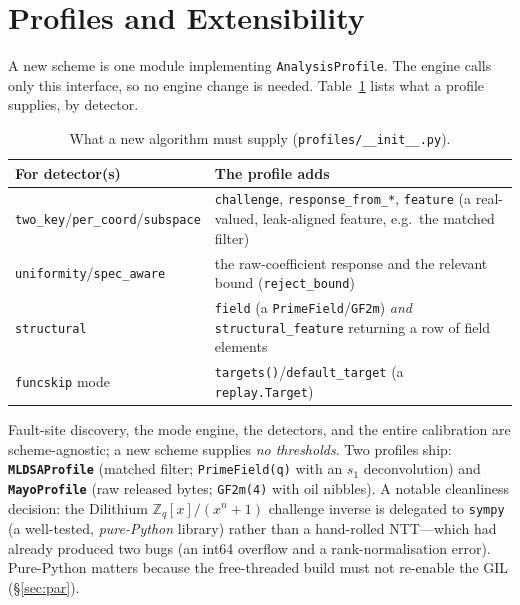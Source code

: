 \documentclass[11pt]{article}
\newcommand{\code}[1]{\texttt{#1}}
\newcommand{\Zq}{\ensuremath{\mathbb{Z}_q}}
\begin{document}
\section{Profiles and Extensibility}\label{sec:profiles}

A new scheme is one module implementing \code{AnalysisProfile}. The engine calls
only this interface, so no engine change is needed. Table~\ref{tab:profile} lists
what a profile supplies, by detector.

\begin{table}[h]
\centering\small
\caption{What a new algorithm must supply (\code{profiles/\_\_init\_\_.py}).}
\label{tab:profile}
\begin{tabular}{@{}p{3.0cm}p{9.5cm}@{}}
\toprule
For detector(s) & The profile adds \\
\midrule
\code{two\_key}/\code{per\_coord}/\code{subspace} & \code{challenge}, \code{response\_from\_*}, \code{feature} (a real-valued, leak-aligned feature, e.g.\ the matched filter) \\
\code{uniformity}/\code{spec\_aware} & the raw-coefficient response and the relevant bound (\code{reject\_bound}) \\
\code{structural} & \code{field} (a \code{PrimeField}/\code{GF2m}) \emph{and} \code{structural\_feature} returning a row of field elements \\
\code{funcskip} mode & \code{targets()}/\code{default\_target} (a \code{replay.Target}) \\
\bottomrule
\end{tabular}
\end{table}

Fault-site discovery, the mode engine, the detectors, and the entire calibration are
scheme-agnostic; a new scheme supplies \emph{no thresholds}. Two profiles ship:
\textbf{\code{MLDSAProfile}} (matched filter; \code{PrimeField(q)} with an $s_1$
deconvolution) and \textbf{\code{MayoProfile}} (raw released bytes;
\code{GF2m(4)} with oil nibbles). A notable cleanliness decision: the Dilithium
$\Zq[x]/(x^n+1)$ challenge inverse is delegated to \code{sympy} (a well-tested,
\emph{pure-Python} library) rather than a hand-rolled NTT---which had already
produced two bugs (an int64 overflow and a rank-normalisation error). Pure-Python
matters because the free-threaded build must not re-enable the GIL (\S\ref{sec:par}).
\end{document}
